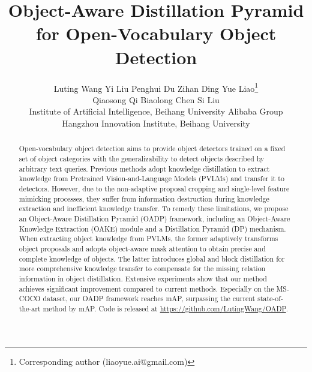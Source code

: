 \documentclass[10pt,twocolumn,letterpaper]{article}
\makeatletter
\def\OADP{Object-Aware Distillation Pyramid}
\def\OAKE{Object-Aware Knowledge Extraction}
\def\DP{Distillation Pyramid}
\newcommand{\@mAP}[2]{mAP}
\newcommand{\mAPN}[1]{\@mAP{N}{#1}}
\newif\ifarxiv
\makeatother
\begin{document}
\renewcommand{\paragraph}[1]{\vspace{6pt minus 6pt}\noindent\textbf{#1}}

\title{\OADP{} for Open-Vocabulary Object Detection}

\ifarxiv
  \author{
    Luting Wang\quad
    Yi Liu\quad
    Penghui Du\quad
    Zihan Ding\quad
    Yue Liao\thanks{Corresponding author (liaoyue.ai@gmail.com)}\\
    Qiaosong Qi\quad
    Biaolong Chen\quad
    Si Liu\\
    Institute of Artificial Intelligence, Beihang University\quad
    Alibaba Group
  }
\else
  \author{
    Luting Wang\quad
    Yi Liu\quad
    Penghui Du\quad
    Zihan Ding\quad
    Yue Liao\thanks{Corresponding author (liaoyue.ai@gmail.com)}\\
    Qiaosong Qi\quad
    Biaolong Chen\quad
    Si Liu\\
    Institute of Artificial Intelligence, Beihang University\quad
    Alibaba Group\\
    Hangzhou Innovation Institute, Beihang University
  }
\fi

\maketitle
 
\begin{abstract}
  Open-vocabulary object detection aims to provide object detectors trained on a fixed set of object categories with the generalizability to detect objects described by arbitrary text queries.
  Previous methods adopt knowledge distillation to extract knowledge from Pretrained Vision-and-Language Models (PVLMs) and transfer it to detectors.
  However, due to the non-adaptive proposal cropping and single-level feature mimicking processes, they suffer from information destruction during knowledge extraction and inefficient knowledge transfer.
  To remedy these limitations, we propose an \OADP{} (OADP) framework, including an \OAKE{} (OAKE) module and a \DP{} (DP) mechanism.
  When extracting object knowledge from PVLMs, the former adaptively transforms object proposals and adopts object-aware mask attention to obtain precise and complete knowledge of objects.
  The latter introduces global and block distillation for more comprehensive knowledge transfer to compensate for the missing relation information in object distillation.
  Extensive experiments show that our method achieves significant improvement compared to current methods.
  Especially on the MS-COCO dataset, our OADP framework reaches  \mAPN{50}, surpassing the current state-of-the-art method by  \mAPN{50}.
  Code is released at \url{https://github.com/LutingWang/OADP}.
\end{abstract}
 
\end{document}
